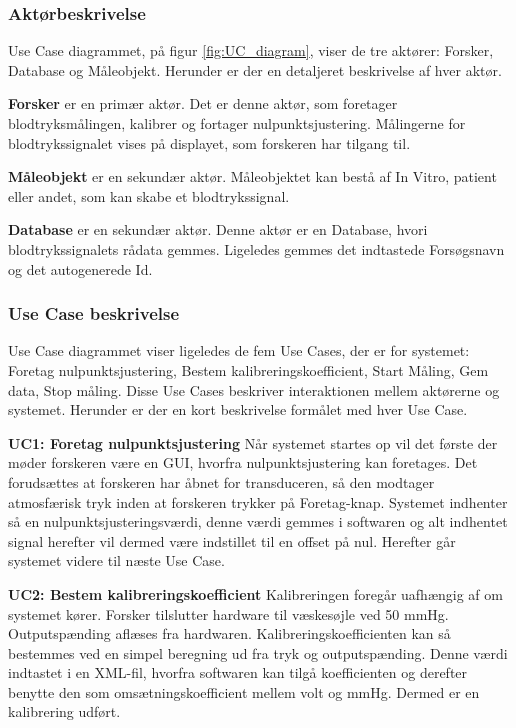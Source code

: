 \subsubsection{Aktørbeskrivelse}
Use Case diagrammet, på figur \ref{fig:UC_diagram}, viser de tre aktører: Forsker, Database og Måleobjekt. Herunder er der en detaljeret beskrivelse af hver aktør.

\textbf{Forsker} er en primær aktør. Det er denne aktør, som foretager blodtryksmålingen, kalibrer og fortager nulpunktsjustering. Målingerne for blodtrykssignalet vises på displayet, som forskeren har tilgang til. 

\textbf{Måleobjekt} er en sekundær aktør. Måleobjektet kan bestå af In Vitro, patient eller andet, som kan skabe et blodtrykssignal. 

\textbf{Database} er en sekundær aktør. Denne aktør er en Database, hvori blodtrykssignalets rådata gemmes. Ligeledes gemmes det indtastede Forsøgsnavn og det autogenerede Id.

\subsubsection{Use Case beskrivelse}
Use Case diagrammet viser ligeledes de fem Use Cases, der er for systemet: Foretag nulpunktsjustering, Bestem kalibreringskoefficient, Start Måling, Gem data, Stop måling. Disse Use Cases beskriver interaktionen mellem aktørerne og systemet. Herunder er der en kort beskrivelse formålet med hver Use Case.

\textbf{UC1: Foretag nulpunktsjustering}
Når systemet startes op vil det første der møder forskeren være en GUI, hvorfra nulpunktsjustering kan foretages. Det forudsættes at forskeren har åbnet for transduceren, så den modtager atmosfærisk tryk inden at forskeren trykker på Foretag-knap. Systemet indhenter så en nulpunktsjusteringsværdi, denne værdi gemmes i softwaren og alt indhentet signal herefter vil dermed være indstillet til en offset på nul. Herefter går systemet videre til næste Use Case.

\textbf{UC2: Bestem kalibreringskoefficient}
Kalibreringen foregår uafhængig af om systemet kører. Forsker tilslutter hardware til væskesøjle ved 50 mmHg. Outputspænding aflæses fra hardwaren. Kalibreringskoefficienten kan så bestemmes ved en simpel beregning ud fra tryk og outputspænding. Denne værdi indtastet i en XML-fil, hvorfra softwaren kan tilgå koefficienten og derefter benytte den som omsætningskoefficient mellem volt og mmHg. Dermed er en kalibrering udført.   

